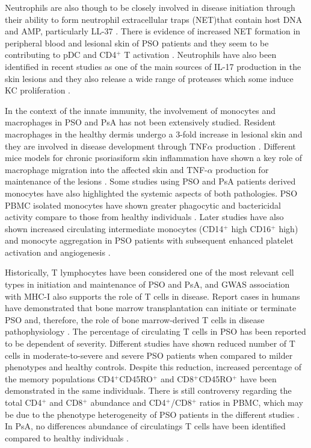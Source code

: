 Neutrophils are also though to be closely involved in disease initiation through their ability to form neutrophil extracellular traps (NET)that contain host DNA and AMP, particularly LL-37 \parencite{Hu2016}. There is evidence of increased NET formation in peripheral blood and lesional skin of PSO patients and they seem to be contributing to pDC and CD4$^+$ T activation \parencite{Hu2016}. Neutrophils have also been identified in recent studies as one of the main sources of IL-17 production in the skin lesions \parencite{Lin2011} and they also release a wide range of proteases which some induce KC proliferation \parencite{Mahil2006}.

In the context of the innate immunity, the involvement of monocytes and macrophages in PSO and PsA has not been extensively studied. Resident macrophages in the healthy dermis undergo a 3-fold increase in lesional skin and they are involved in disease development through TNF$\alpha$ production \parencite{Perera2012, Mahil2016}. Different mice models for chronic psoriasiform skin inflammation have shown a key role of macrophage migration into the affected skin and TNF-$\alpha$ production for maintenance of the lesions \parencite{Stratis2006, Wang2006}. Some studies using PSO and PsA patients derived monocytes have also highlighted the systemic aspects of both pathologies. PSO PBMC isolated monocytes have shown greater phagocytic and bactericidal activity compare to those from healthy individuals \parencite{Bar-Eli1979}. Later studies have also shown increased circulating intermediate monocytes (CD14$^{+}$ high CD16$^{+}$ high) and monocyte aggregation in PSO patients with subsequent enhanced platelet activation and angiogenesis \parencite {Golden2015}. %

Historically, T lymphocytes have been considered one of the most relevant cell types in initiation and maintenance of PSO and PsA, and GWAS association with MHC-I also supports the role of T cells in disease. Report cases in humans have demonstrated that bone marrow transplantation can initiate or terminate PSO and, therefore, the role of bone marrow-derived T cells in disease pathophysiology \parencite{Eedy1990, Gardembas1990}. The percentage of circulating T cells in PSO has been reported to be dependent of severity. Different studies have shown reduced number of T cells in moderate-to-severe and severe PSO patients when compared to milder phenotypes and healthy controls. Despite this reduction, increased percentage of the memory populations CD4$^{+}$CD45RO$^{+}$ and CD8$^{+}$CD45RO$^{+}$ have been demonstrated in the same individuals\parencite{Lecewicz-Toruń2001,Langewouters2008}. There is still controversy regarding the total CD4$^+$ and CD8$^{+}$ abundance and CD4$^{+}$/CD8$^{+}$ ratios in PBMC, which may be due to the phenotype heterogeneity of PSO patients in the different studies \parencite{Lecewicz-Toruń2001,Cameron2003,Langewouters2008}. In PsA, no differences  abundance of circulatings T cells have been identified compared to healthy individuals \parencite{Costello1999}.


